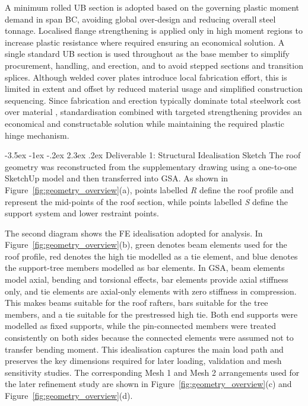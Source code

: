 \documentclass[10pt,a4paper]{article}
\makeatletter
\renewcommand\section{\@startsection{section}{1}{\z@}
  {-3.5ex \@plus -1ex \@minus -.2ex}
  {2.3ex \@plus .2ex}
  {\normalfont\Large}}
\makeatother
\begin{document}
A minimum rolled UB section is adopted based on the governing plastic moment demand in span BC, avoiding global over-design and reducing overall steel tonnage. Localised flange strengthening is applied only in high moment regions to increase plastic resistance where required ensuring an economical solution. A single standard UB section is used throughout as the base member to simplify procurement, handling, and erection, and to avoid stepped sections and transition splices. Although welded cover plates introduce local fabrication effort, this is limited in extent and offset by reduced material usage and simplified construction sequencing. Since fabrication and erection typically dominate total steelwork cost over material \cite{structural_steel_cost_estimation}, standardisation combined with targeted strengthening provides an economical and constructable solution while maintaining the required plastic hinge mechanism.

\newpage

\section{Deliverable 1: Structural Idealisation Sketch} 
The roof geometry was reconstructed from the supplementary drawing using a one-to-one SketchUp model and then transferred into GSA. As shown in Figure~\ref{fig:geometry_overview}(a), points labelled \textit{R} define the roof profile and represent the mid-points of the roof section, while points labelled \textit{S} define the support system and lower restraint points. 

The second diagram shows the FE idealisation adopted for analysis. In Figure~\ref{fig:geometry_overview}(b), green denotes beam elements used for the roof profile, red denotes the high tie modelled as a tie element, and blue denotes the support-tree members modelled as bar elements. In GSA, beam elements model axial, bending and torsional effects, bar elements provide axial stiffness only, and tie elements are axial-only elements with zero stiffness in compression. This makes beams suitable for the roof rafters, bars suitable for the tree members, and a tie suitable for the prestressed high tie. Both end supports were modelled as fixed supports, while the pin-connected members were treated consistently on both sides because the connected elements were assumed not to transfer bending moment. This idealisation captures the main load path and preserves the key dimensions required for later loading, validation and mesh sensitivity studies. The corresponding Mesh 1 and Mesh 2 arrangements used for the later refinement study are shown in Figure~\ref{fig:geometry_overview}(c) and Figure~\ref{fig:geometry_overview}(d).
\end{document}
